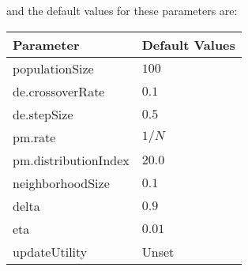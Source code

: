 \newline
\newline
and the default values for these parameters are:
\newline
\newline
\begin{tabularx}{\linewidth}{lX}
  \hline
  Parameter & Default Values \\
  \hline
  populationSize & $100$ \\
  de.crossoverRate & $0.1$ \\
  de.stepSize & $0.5$ \\
  pm.rate & $1/N$ \\
  pm.distributionIndex & $20.0$ \\
  neighborhoodSize & $0.1$ \\
  delta & $0.9$ \\
  eta & $0.01$ \\
  updateUtility & Unset \\
  \hline
\end{tabularx}

